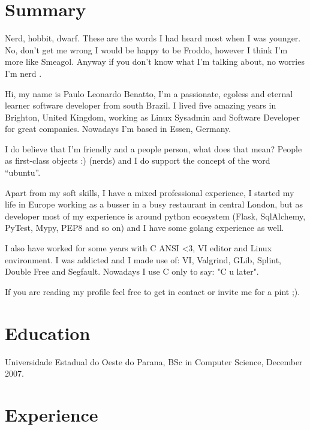 \documentclass[margin]{res}
\begin{document}
  

\address{Essen, DE \\ benatto@gmail.com \\ Phone: +49 017677556352 \\ Post Code: 45130 }
                           
                        
\begin{resume}
 
\section{Summary}

Nerd, hobbit, dwarf. These are the words I had heard most when I was younger. No, don't get me wrong
I would be happy to be Froddo, however I think I'm more like Smeagol. Anyway if you don't know what
I'm talking about, no worries I'm nerd \Laughey[1.4].
 
Hi, my name is Paulo Leonardo Benatto, I'm a passionate, egoless and eternal learner software developer
from south Brazil. I lived five amazing years in Brighton, United Kingdom, working as Linux Sysadmin and
Software Developer for great companies. Nowadays I’m based in Essen, Germany.

I do believe that I’m friendly and a people person, what does that mean? People as first-class objects :)
(nerds) and I do support the concept of the word “ubuntu”.

Apart from my soft skills, I have a mixed professional experience, I started my life in Europe working as
a busser in a busy restaurant in central London, but as developer most of my experience is around python
ecosystem (Flask, SqlAlchemy, PyTest, Mypy, PEP8 and so on) and I have some golang experience as well.

I also have worked for some years with C ANSI <3, VI editor and Linux environment. I was addicted and
I made use of: VI, Valgrind, GLib, Splint, Double Free and Segfault. Nowadays I use C only to say: "C u later".
 
If you are reading my profile feel free to get in contact or invite me for a pint ;).
 
\section{Education}	Universidade Estadual do Oeste do Parana, BSc in Computer Science, December 2007.

\section{Experience}



\end{resume}
\end{document}

